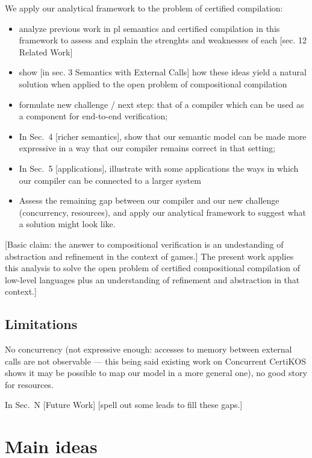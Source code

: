 \documentclass[sigplan,10pt,review,anonymous]{acmart}
\begin{document}
{We apply our analytical framework to the problem of certified compilation:
\begin{itemize}
\item analyze previous work in pl semantics and certified compilation
  in this framework to assess and explain the strenghts and weaknesses of each
  [sec. 12 Related Work]
\item show [in sec. 3 Semantics with External Calls]
  how these ideas yield a natural solution
  when applied to the open problem of compositional compilation
\item formulate new challenge / next step:
  that of a compiler which can be used as a component
  for end-to-end verification;
\item In Sec.~4 [richer semantics],
  show that our semantic model can be made more expressive
  in a way that our compiler remains correct in that setting;
\item In Sec.~5 [applications],
  illustrate with some applications
  the ways in which our compiler can be connected
  to a larger system
\item Assess the remaining gap between our compiler
  and our new challenge (concurrency, resources),
  and apply our analytical framework to suggest
  what a solution might look like.
\end{itemize}

[Basic claim: the answer to compositional verification
is an undestanding of abstraction and refinement in the context of games.]
The present work applies this analysis to
solve the open problem of certified compositional compilation of low-level languages
plus an understanding of refinement and abstraction in that context.]

\subsection{Limitations}

No concurrency
(not expressive enough:
accesses to memory between external calls are not observable
--- this being said existing work on Concurrent CertiKOS shows
it may be possible to map our model in a more general one),
no good story for resources.

In Sec.~N [Future Work] [spell out some leads to fill these gaps.]

} %


\section{Main ideas} %
\end{document}
